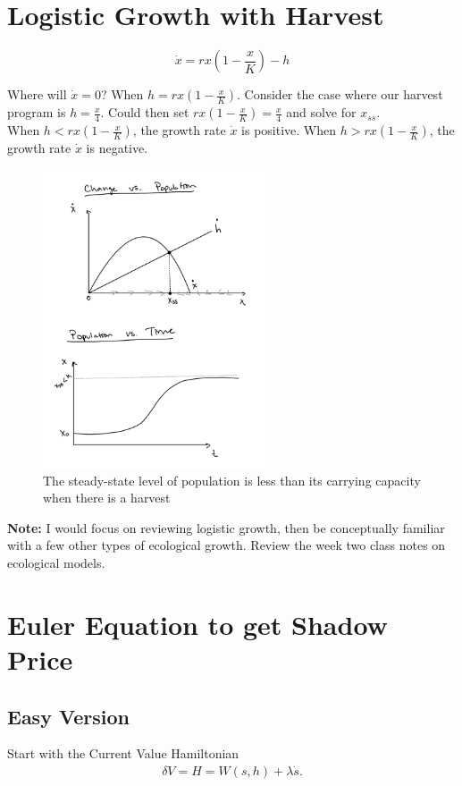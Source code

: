 \documentclass[12pt]{article}
\begin{document}
\section{Logistic Growth with Harvest}
$$ \dot x =rx(1 - \frac{x}{K}) - h $$ 

Where will $\dot x = 0$? When $h = rx(1 - \frac{x}{K})$. Consider the case where our harvest program is $h = \frac{x}{4}$. Could then set  $rx(1 - \frac{x}{K}) = \frac{x}{4}$ and solve for $x_{ss}$. \\

When $h < rx(1 - \frac{x}{K})$, the growth rate $\dot x$ is positive. When $h > rx(1 - \frac{x}{K})$, the growth rate $\dot x$ is negative.

\begin{figure}[h]
    \centering
    \includegraphics[width=0.6\textwidth]{harvest.png}
    \caption{The steady-state level of population is less than its carrying capacity when there is a harvest}
\end{figure}

\textbf{Note:} I would focus on reviewing logistic growth, then be conceptually familiar with a few other types of ecological growth. Review the week two class notes on ecological models. 


\section{Euler Equation to get Shadow Price \label{euler_section}}

\subsection{Easy Version \label{easy_vers}} 
Start with the Current Value Hamiltonian 
\begin{align}
    \delta V = H = W(s, h) + \lambda \dot s. \label{CVH_1}
\end{align}
\end{document}
